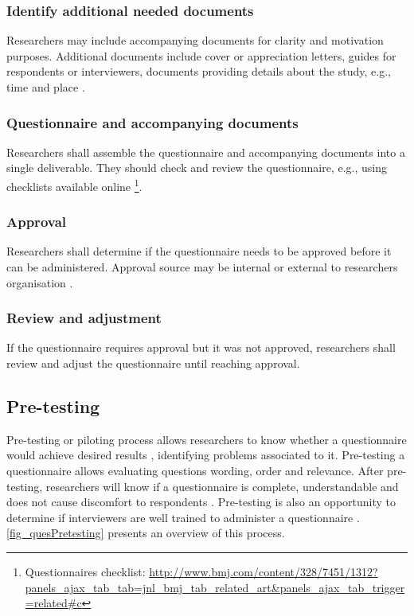 \subsubsection{Identify additional needed documents}
Researchers may include accompanying documents for clarity and motivation purposes. Additional documents include cover or appreciation letters, guides for respondents or interviewers, documents providing details about the study, e.g., time and place \cite{Diem,Crawford1997,Boynton2004b}.

\subsubsection{Questionnaire and accompanying documents}
Researchers shall assemble the questionnaire and accompanying documents into a single deliverable. They should check and review the questionnaire, e.g., using checklists available online \footnote{Questionnaires checklist: \url{http://www.bmj.com/content/328/7451/1312?panels_ajax_tab_tab=jnl_bmj_tab_related_art&panels_ajax_tab_trigger=related\#c}}.

\subsubsection{Approval}
Researchers shall determine if the questionnaire needs to be approved before it can be administered. Approval source may be internal or external to researchers organisation \cite{Diem}.

\subsubsection{Review and adjustment}
If the questionnaire requires approval but it was not approved, researchers shall review and adjust the questionnaire until reaching approval.

\subsection{Pre-testing}
\label{sec:ques_pretesting}
Pre-testing or piloting process allows researchers to know whether a questionnaire would achieve desired results \cite{Crawford1997}, identifying problems associated to it. Pre-testing a questionnaire allows evaluating questions wording, order and relevance. After pre-testing, researchers will know if a questionnaire is complete, understandable and does not cause discomfort to respondents \cite{Boynton2004}. Pre-testing is also an opportunity to determine if interviewers are well trained to administer a questionnaire \cite{Crawford1997}. \autoref{fig_quesPretesting} presents an overview of this process.

